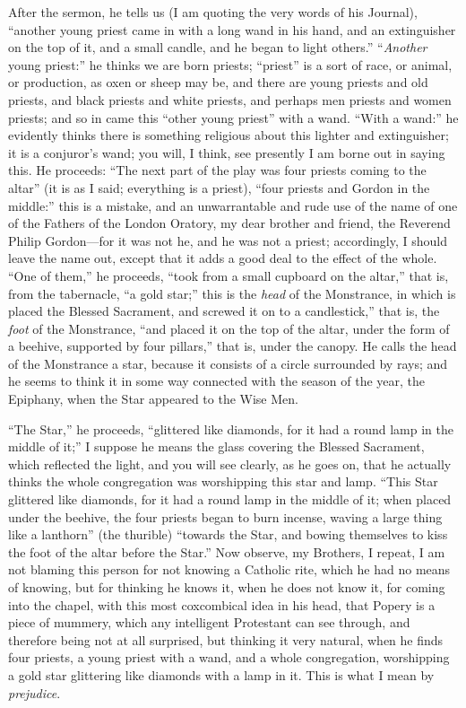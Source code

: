 After the sermon, he tells us (I am quoting the very
words of his Journal), ``another young priest came in
with a long wand in his hand, and an extinguisher on the
top of it, and a small candle, and he began to light
others.'' ``\emph{Another} young priest:''
he thinks we are born priests; ``priest'' is a
sort of race, or animal, or production, as oxen or sheep
may be, and there are young priests and old priests, and
black priests and white priests, and perhaps men priests
and women priests; and so in came this ``other young
priest'' with a wand. ``With a wand:'' he
evidently thinks there is something religious about this
lighter and extinguisher; it is a conjuror's wand; you
will, I think, see presently I am borne out in saying
this. He proceeds: ``The next part of the play was
four priests coming to the altar'' (it is as I said;
everything is a priest), ``four priests and Gordon in
the middle:'' this is a mistake, and an unwarrantable
and rude use of the name of one of the Fathers of the
London Oratory, my dear brother and friend, the Reverend
Philip Gordon—for it was not he, and he was not a
priest; accordingly, I should leave the name out, except
that it adds a good deal to the effect of the whole.
``One of them,'' he proceeds, ``took from a
small cupboard on the altar,'' that is, from the
tabernacle, ``a gold star;'' this is the \emph{head}
of the Monstrance, in which is placed the Blessed
Sacrament, and screwed it on to a candlestick,'' that
is, the \emph{foot} of the Monstrance, ``and placed
it on the top of the altar, under the form of a beehive,
supported by four pillars,'' that is, under the
canopy. He calls the head of the Monstrance a star,
because it consists of a circle surrounded by rays; and
he seems to think it in some way connected with the
season of the year, the Epiphany, when the Star appeared
to the Wise Men.

``The Star,'' he proceeds, ``glittered
like diamonds, for it had a round lamp in the middle of
it;'' I suppose he means the glass covering the
Blessed Sacrament, which reflected the light, and you
will see clearly, as he goes on, that he actually thinks
the whole congregation was worshipping this star and
lamp. ``This Star glittered like diamonds, for it had
a round lamp in the middle of it; when placed under the
beehive, the four priests began to burn incense, waving a
large thing like a lanthorn'' (the thurible)
``towards the Star, and bowing themselves to kiss the
foot of the altar before the Star.'' Now observe, my
Brothers, I repeat, I am not blaming this person for not
knowing a Catholic rite, which he had no means of
knowing, but for thinking he knows it, when he does not
know it, for coming into the chapel, with this most
coxcombical idea in his head, that Popery is a piece of
mummery, which any intelligent Protestant can see
through, and therefore being not at all surprised, but
thinking it very natural, when he finds four priests, a
young priest with a wand, and a whole congregation,
worshipping a gold star glittering like diamonds with a
lamp in it. This is what I mean by \emph{prejudice}.

